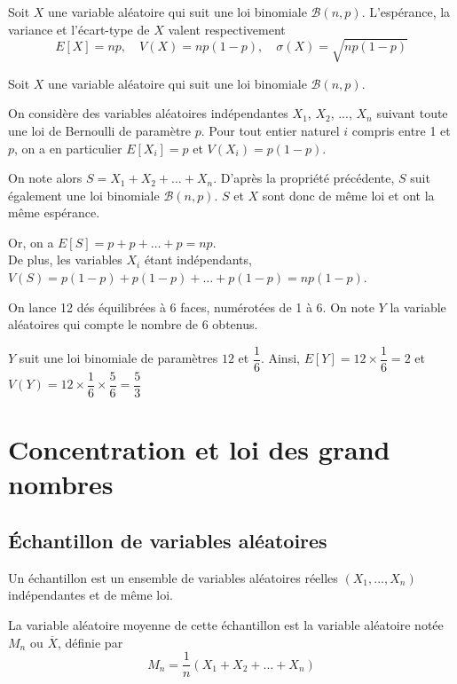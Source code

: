 \documentclass[11pt,fleqn, openany]{book} %
\begin{document}
\begin{proposition}Soit $X$ une variable aléatoire qui suit une loi binomiale $\mathcal{B}(n,p)$. L'espérance, la variance et l'écart-type de $X$ valent respectivement \[E[X]=np, \quad V(X)=np(1-p), \quad \sigma(X)=\sqrt{np(1-p)}\]\end{proposition}

\begin{demonstration}Soit $X$ une variable aléatoire qui suit une loi binomiale $\mathcal{B}(n,p)$. 

On considère des variables aléatoires indépendantes $X_1$, $X_2$, ..., $X_n$  suivant toute une loi de Bernoulli de paramètre $p$. Pour tout entier naturel $i$ compris entre 1 et $p$, on a en particulier $E[X_i]=p$ et $V(X_i)=p(1-p)$.

On note alors $S=X_1+X_2+\ldots +X_n$. D'après la propriété précédente, $S$ suit également une loi binomiale $\mathcal{B}(n,p)$. $S$ et $X$ sont donc de même loi et ont la même espérance.

Or, on a $E[S] = p + p + \ldots + p = np$.\\ De plus, les variables $X_i$ étant indépendants, $V(S)=p(1-p)+p(1-p)+\ldots + p(1-p)=np(1-p)$.\end{demonstration}

\begin{example}On lance 12 dés équilibrées à 6 faces, numérotées de 1 à 6. On note $Y$ la variable aléatoires qui compte le nombre de 6 obtenus. 

$Y$ suit une loi binomiale de paramètres $12$ et $\dfrac{1}{6}$. Ainsi, $E[Y]=12 \times \dfrac{1}{6}=2$ et $V(Y)=12 \times \dfrac{1}{6}\times \dfrac{5}{6}=\dfrac{5}{3}$\end{example}



\section{Concentration et loi des grand nombres}
\subsection{Échantillon de variables aléatoires}

\begin{definition} Un échantillon est un ensemble de variables aléatoires réelles $(X_1, ..., X_n)$ indépendantes et de même loi.

La variable aléatoire moyenne de cette échantillon est la variable aléatoire notée $M_n$ ou $\overline{X}$, définie par 
\[ M_n = \dfrac{1}{n} (X_1+X_2+\ldots + X_n)\]\end{definition}
\end{document}
